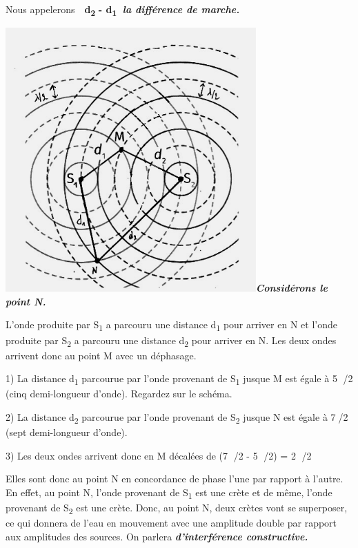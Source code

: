 Nous appelerons \textbf{ d}\textsubscript{\textbf{2 }}\textbf{-
d}\textsubscript{\textbf{1 }}\textbf{}\emph{\textbf{la différence de
marche.}}

\includegraphics[width=9.596cm,height=10.112cm]{Pictures/10000001000001DE000001F885F9EB969C92123B.png}\emph{\textbf{Considérons
le point N. }}

L'onde produite par S\textsubscript{1} a parcouru une distance
d\textsubscript{1} pour arriver en N et l'onde produite par
S\textsubscript{2} a parcouru une distance d\textsubscript{2} pour
arriver en N. Les deux ondes arrivent donc au point M avec un déphasage.

1) La distance d\textsubscript{1} parcourue par l'onde provenant de
S\textsubscript{1} jusque M est égale à 5 /2 (cinq demi-longueur
d'onde). Regardez sur le schéma.

2) La distance d\textsubscript{2} parcourue par l'onde provenant de
S\textsubscript{2} jusque N est égale à 7/2 (sept demi-longueur
d'onde).

3) Les deux ondes arrivent donc en M décalées de (7 /2 - 5 /2) = 2 /2

Elles sont donc au point N en concordance de phase l'une par rapport à
l'autre. En effet, au point N, l'onde provenant de S\textsubscript{1}
est une crète et de même, l'onde provenant de S\textsubscript{2} est une
crète. Donc, au point N, deux crètes vont se superposer, ce qui donnera
de l'eau en mouvement avec une amplitude double par rapport aux
amplitudes des sources. On parlera \emph{\textbf{d'interférence
constructive.}}

\emph{\textbf{ }}

